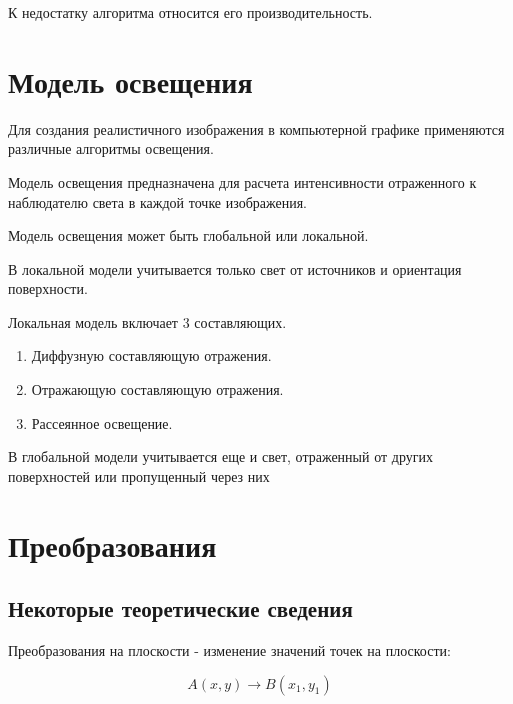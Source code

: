 К недостатку алгоритма относится его производительность.

\section {Модель освещения}

Для создания реалистичного изображения в компьютерной графике применяются различные алгоритмы освещения.

Модель освещения предназначена для расчета интенсивности
отраженного к наблюдателю света в каждой точке изображения.

Модель освещения может быть глобальной или локальной.

В локальной модели учитывается только свет от источников и ориентация поверхности.

Локальная модель включает 3 составляющих.

\begin{enumerate}
	\item Диффузную составляющую отражения.
	\item Отражающую составляющую отражения.
	\item Рассеянное освещение.
\end{enumerate}

В глобальной модели учитывается еще и свет, отраженный от других поверхностей или пропущенный через них



\section {Преобразования}

\subsection {Некоторые теоретические сведения}

Преобразования на плоскости - изменение значений точек на плоскости:

\begin{equation}
	A(x,y)\rightarrow B(x_1,y_1)
\end{equation}

